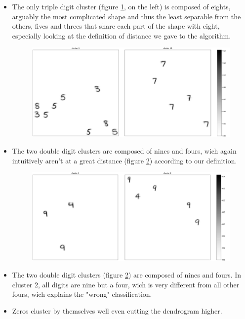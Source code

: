 \documentclass[a4paper]{report}
\begin{document}
\begin{itemize}
    \item The only triple digit cluster (figure \ref{910}, on the left) is composed of eights, arguably the most complicated shape and thus the least separable from the others, fives and threes that share each part of the shape with eight, especially looking at the definition of distance we gave to the algorithm.
    
\begin{figure} [H]
    \centering
    \includegraphics [width=\textwidth ] {c/h/9.png}
    \caption{}
    \label{910}
\end{figure}

    \item The two double digit clusters are composed of nines and fours, wich again intuitively aren't at a great distance (figure \ref{12}) according to our definition.

\begin{figure} [H]
    \centering
    \includegraphics [width=\textwidth ] {c/h/1.png}
    \caption{}
    \label{12}
\end{figure}
    
    \item The two double digit clusters (figure \ref{12}) are composed of nines and fours. In cluster 2, all digits are nine but a four, wich is very different from all other fours, wich explains the "wrong" classification.
    \item Zeros cluster by themselves well even cutting the dendrogram higher.
    

\end{itemize}
\end{document}
